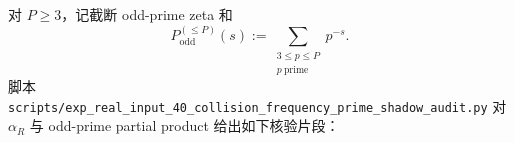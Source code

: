\begin{remark}\label{rem:xi-time-part9p-frequency-prime-shadow-audit}
对 \(P\ge 3\)，记截断 odd-prime zeta 和
\[
P_{\mathrm{odd}}^{(\le P)}(s):=\sum_{\substack{3\le p\le P\\ p\ \mathrm{prime}}}p^{-s}.
\]
脚本 \texttt{scripts/exp\_real\_input\_40\_collision\_frequency\_prime\_shadow\_audit.py} 对 \(\alpha_R\) 与 odd-prime partial product 给出如下核验片段：

\end{remark}
